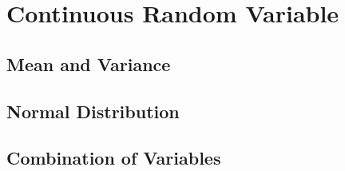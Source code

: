 \documentclass[../main]{subfiles}
\begin{document}
\section{Continuous Random Variable}

\subsection{Mean and Variance}

\subsection{Normal Distribution}

\subsection{Combination of Variables}
\end{document}
